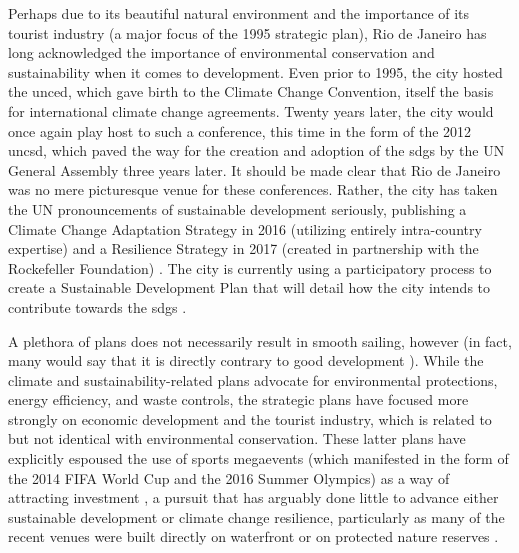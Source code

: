Perhaps due to its beautiful natural environment and the importance of its tourist industry (a major focus of the 1995 strategic plan), Rio de Janeiro has long acknowledged the importance of environmental conservation and sustainability when it comes to development. Even prior to 1995, the city hosted the \ac{unced}, which gave birth to the Climate Change Convention, itself the basis for international climate change agreements. Twenty years later, the city would once again play host to such a conference, this time in the form of the 2012 \ac{uncsd}, which paved the way for the creation and adoption of the \acp{sdg} by the UN General Assembly three years later. It should be made clear that Rio de Janeiro was no mere picturesque venue for these conferences. Rather, the city has taken the UN pronouncements of sustainable development seriously, publishing a Climate Change Adaptation Strategy in 2016 (utilizing entirely intra-country expertise)  \cite{prefeituradacidadedoriodejaneiroClimateChangeAdaption2016} and a Resilience Strategy in 2017 (created in partnership with the Rockefeller Foundation) \cite{100resilientcitiesResilienceStrategyCity2017}. The city is currently using a participatory process to create a Sustainable Development Plan that will detail how the city intends to contribute towards the \acp{sdg} \cite{unitednationsbrazilONUConvidaCariocas2019}.

A plethora of plans does not necessarily result in smooth sailing, however (in fact, many would say that it is directly contrary to good development \cite{easterlyWhiteManBurden2007a}). While the climate and sustainability-related plans advocate for environmental protections, energy efficiency, and waste controls, the strategic plans have focused more strongly on economic development and the tourist industry, which is related to but not identical with environmental conservation. These latter plans have explicitly espoused the use of sports megaevents (which manifested in the form of the 2014 FIFA World Cup and the 2016 Summer Olympics) as a way of attracting investment \cite{sanchezMegaeventsUrbanRegeneration2013}, a pursuit that has arguably done little to advance either sustainable development or climate change resilience, particularly as many of the recent venues were built directly on waterfront or on protected nature reserves \cite{connorsLocalGolfersTest2016}. 

